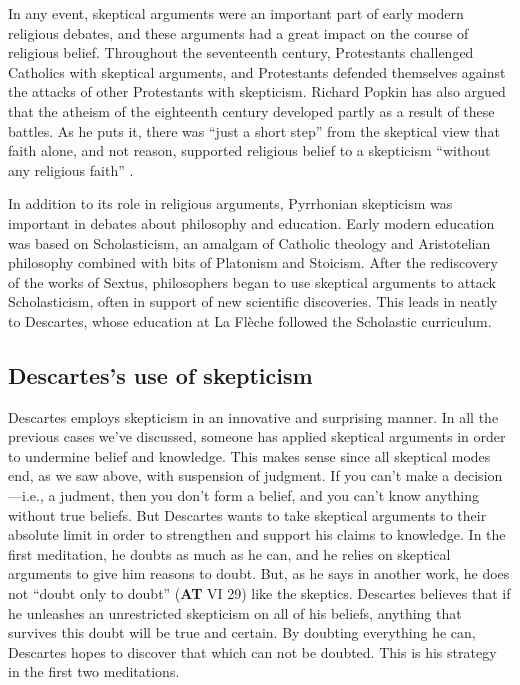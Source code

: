 In any event, skeptical arguments were an important part of early modern religious debates, and these arguments had a great impact on the course of religious belief. Throughout the seventeenth century, Protestants challenged Catholics with skeptical arguments, and Protestants defended themselves against the attacks of other Protestants with skepticism. Richard Popkin has also argued that the atheism of the eighteenth century developed partly as a result of these battles. As he puts it, there was ``just a short step'' from the skeptical view that faith alone, and not reason, supported religious belief to a skepticism ``without any religious faith'' \parencite[19]{popkin1993}.

In addition to its role in religious arguments, Pyrrhonian skepticism was important in debates about philosophy and education. Early modern education was based on Scholasticism, an amalgam of Catholic theology and Aristotelian philosophy combined with bits of Platonism and Stoicism. After the rediscovery of the works of Sextus, philosophers began to use skeptical arguments to attack Scholasticism, often in support of new scientific discoveries. This leads in neatly to Descartes, whose education at La Flèche followed the Scholastic curriculum.

\subsection*{Descartes's use of skepticism}

Descartes employs skepticism in an innovative and surprising manner. In all the previous cases we've discussed, someone has applied skeptical arguments in order to undermine belief and knowledge. This makes sense since all skeptical modes end, as we saw above, with suspension of judgment. If you can't make a decision---i.e., a judment, then you don't form a belief, and you can't know anything without true beliefs. But Descartes wants to take skeptical arguments to their absolute limit in order to strengthen and support his claims to knowledge. In the first meditation, he doubts as much as he can, and he relies on skeptical arguments to give him reasons to doubt. But, as he says in another work, he does not ``doubt only to doubt'' (\textbf{AT} VI 29) like the skeptics. Descartes believes that if he unleashes an unrestricted skepticism on all of his beliefs, anything that survives this doubt will be true and certain. By doubting everything he can, Descartes hopes to discover that which can not be doubted. This is his strategy in the first two meditations.

